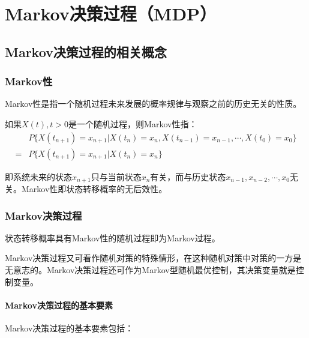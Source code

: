 \chapter{Markov决策过程（MDP）}

\section{Markov决策过程的相关概念}

\subsection{Markov性}

Markov性是指一个随机过程未来发展的概率规律与观察之前的历史无关的性质。

如果$X(t),t>0$是一个随机过程，则Markov性指：
\begin{equation}
    \begin{aligned}
         & P\{X(t_{n+1})= x_{n+1}|X(t_n)=x_n,X(t_{n-1})=x_{n-1},\cdots,X(t_0) =x_0\} \\=&P\{X(t_{n+1})= x_{n+1}|X(t_n)=x_n\}
    \end{aligned}
\end{equation}

即系统未来的状态$x_{n+1}$只与当前状态$x_n$有关，而与历史状态$x_{n-1},x_{n-2},\cdots,x_0$无关。Markov性即状态转移概率的无后效性。

\subsection{Markov决策过程}

状态转移概率具有Markov性的随机过程即为Markov过程。

\begin{note}
    Markov决策过程又可看作随机对策的特殊情形，在这种随机对策中对策的一方是无意志的。Markov决策过程还可作为Markov型随机最优控制，其决策变量就是控制变量。
\end{note}

\subsubsection{Markov决策过程的基本要素}

Markov决策过程的基本要素包括：

